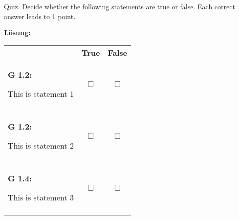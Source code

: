 \newpage
\begin{aufgabe}{12}{0}{0}{0}{0}{0}{0}{0}
\vspace{0.2cm}

 Quiz. Decide whether the following statements are true or false. Each correct answer leads to 1 point. \\
\begin{loesung}
\textbf{Lösung:}
\end{loesung}

  \begin{tabular}{p{30em} c c} 
  
                                                                                                                 & \textbf{True} & \textbf{False} \\ 
                        
\begin{lernziel}\textbf{G 1.2:}\end{lernziel}
This is statement 1  & 
 \begin{loesung}\rlap{\xmark}\end{loesung}$\Box$    &$\Box$    \\                                                                                                               
& & \\

\begin{lernziel}\textbf{G 1.2:}\end{lernziel}
This is statement 2 & 
$\Box$    & \begin{loesung}\rlap{\xmark}\end{loesung}$\Box$    \\                                                                                                               
& & \\

\begin{lernziel}\textbf{G 1.4:}\end{lernziel}
This is statement 3  & 
 \begin{loesung}\rlap{\xmark}\end{loesung}$\Box$    &$\Box$    \\                                                                                                               
& & \\

                    
\end{tabular}
\end{aufgabe}




